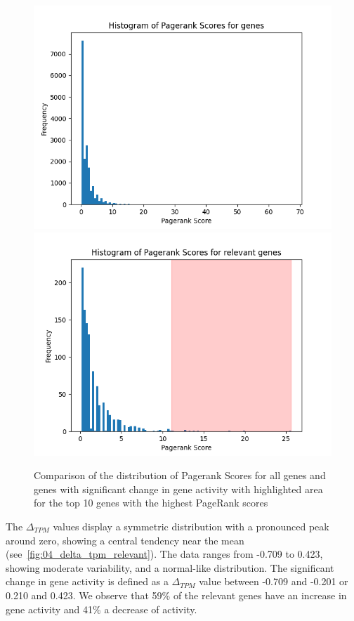 \begin{figure}[h]
        \includegraphics[width=\linewidth]{figures/04_hist_pagerank}
    \endminipage
    \hfill
      \includegraphics[width=\linewidth]{figures/04_hist_pagerank_relevant}
    \endminipage
    \caption{Comparison of the distribution of Pagerank Scores for all genes and genes with significant change in gene activity
    with highlighted area for the top 10 genes with the highest PageRank scores}
    \label{fig:04_hist_pagerank}
\end{figure}

The $\Delta_{TPM}$ values display a symmetric distribution with a pronounced peak around zero, showing a central tendency near the mean
(see~\cref{fig:04_delta_tpm_relevant}).
The data ranges from -0.709 to 0.423, showing moderate variability, and a normal-like distribution.
The significant change in gene activity is defined as a $\Delta_{TPM}$ value between -0.709 and -0.201 or 0.210 and 0.423.
We observe that 59\% of the relevant genes have an increase in gene activity and 41\% a decrease of activity.\\

